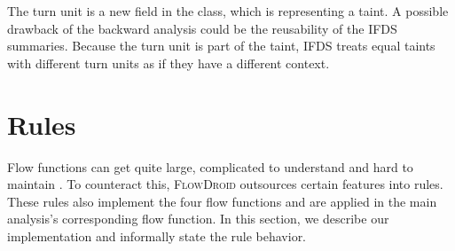 \documentclass[../draft.tex]{subfiles}
\begin{document}


    The turn unit is a new field in the  class, which is representing a taint.
    A possible drawback of the backward analysis could be the reusability of the IFDS summaries.
    Because the turn unit is part of the taint, IFDS treats equal taints with different turn units as if they have a different context.

    \section{Rules}\label{s:rules}
    Flow functions can get quite large, complicated to understand and hard to maintain \cite{Lerch2015}.
    To counteract this, \textsc{FlowDroid} outsources certain features into rules.
    These rules also implement the four flow functions and are applied in the main analysis's corresponding flow function.
    In this section, we describe our implementation and informally state the rule behavior.
\end{document}
